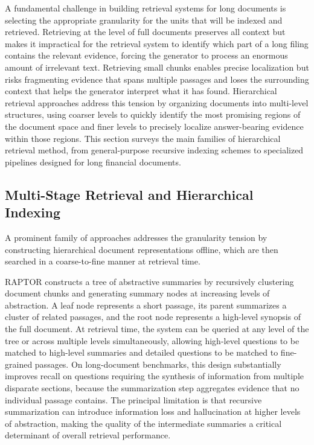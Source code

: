 \documentclass[12pt,twoside,maitrise]{dms}
\theoremstyle{definition}
\numberwithin{equation}{section}
\numberwithin{table}{chapter}
\numberwithin{figure}{chapter}
\begin{document}

A fundamental challenge in building retrieval systems for long documents is selecting the
appropriate granularity for the units that will be indexed and retrieved. Retrieving at
the level of full documents preserves all context but makes it impractical for the
retrieval system to identify which part of a long filing contains the relevant evidence,
forcing the generator to process an enormous amount of irrelevant text. Retrieving small
chunks enables precise localization but risks fragmenting evidence that spans multiple
passages and loses the surrounding context that helps the generator interpret what it has
found. Hierarchical retrieval approaches address this tension by organizing documents
into multi-level structures, using coarser levels to quickly identify the most promising
regions of the document space and finer levels to precisely localize answer-bearing
evidence within those regions. This section surveys the main families of hierarchical
retrieval method, from general-purpose recursive indexing schemes to specialized
pipelines designed for long financial documents.

\subsection{Multi-Stage Retrieval and Hierarchical Indexing}

A prominent family of approaches addresses the granularity tension by constructing
hierarchical document representations offline, which are then searched in a
coarse-to-fine manner at retrieval time.

RAPTOR \citep{sarthi2024raptor} constructs a tree of abstractive summaries by
recursively clustering document chunks and generating summary nodes at increasing levels
of abstraction. A leaf node represents a short passage, its parent summarizes a cluster
of related passages, and the root node represents a high-level synopsis of the full
document. At retrieval time, the system can be queried at any level of the tree or across
multiple levels simultaneously, allowing high-level questions to be matched to high-level
summaries and detailed questions to be matched to fine-grained passages. On long-document
benchmarks, this design substantially improves recall on questions requiring the
synthesis of information from multiple disparate sections, because the summarization step
aggregates evidence that no individual passage contains. The principal limitation is
that recursive summarization can introduce information loss and hallucination at higher
levels of abstraction, making the quality of the intermediate summaries a critical
determinant of overall retrieval performance.
\end{document}
